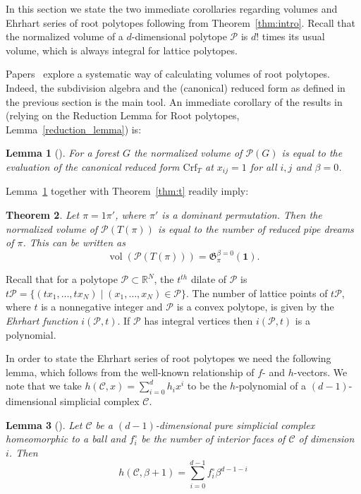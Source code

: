 \documentclass[10pt]{amsart}
\newtheorem{theo}{Theorem}[section]
\newtheorem{lemm}[theo]{Lemma}
\theoremstyle{definition}
\numberwithin{equation}{section}
\DeclareMathOperator{\vol}{vol}
\newcommand*{\Crf}{\mathrm{Crf}}
\newcommand*\C{{\mathcal{C}}}
\renewcommand*\P{{\mathcal{P}}}
\newcommand*\+{\smash{\lower2pt\hbox{\rlap{\vrule height14pt}}\raise2pt\hbox{\rlap{\hskip-3pt \vrule height.4pt depth0pt width14.7pt}}}}
\begin{document}
In this section we state the two immediate corollaries regarding volumes and Ehrhart series of root polytopes following from Theorem~\ref{thm:intro}. Recall that the normalized volume of a $d$-dimensional polytope $\P$ is $d!$ times its usual volume, which is always integral for lattice polytopes.

Papers~\cite{root1, root2} explore a systematic way of calculating volumes of root polytopes. Indeed, the subdivision algebra and the (canonical) reduced form as defined in the previous section is the main tool. An immediate corollary of the results in~\cite{root1} (relying on the Reduction Lemma for Root polytopes, Lemma~\ref{reduction_lemma}) is:

\begin{lemm}[\cite{root1}]\label{l:vol}
For a forest $G$ the normalized volume of $\P(G)$ is equal to the evaluation of the canonical reduced form $\Crf_T$ at $x_{ij}=1$ for all $i,j$ and $\beta=0$.
\end{lemm}

Lemma~\ref{l:vol} together with Theorem~\ref{thm:t} readily imply:

\begin{theo}\label{thm:vol}
Let $\pi=1\pi'$, where $\pi'$ is a dominant permutation. Then the normalized volume of $\P(T(\pi))$ is equal to the number of reduced pipe dreams of $\pi$. This can be written as
\begin{equation}
\vol(\P(T(\pi)))=\mathfrak{G}^{\beta=0}_{\pi} (\mathbf{1}).
\end{equation}
\end{theo}

Recall that for a polytope $\mathcal{P}\subset \mathbb{R}^{N}$, the {$t^{th}$ dilate} of $\mathcal{P}$ is $\displaystyle t \mathcal{P}=\{(tx_1, \dots, tx_{N}) \mid (x_1, \dots, x_{N}) \in \mathcal{P}\}.$ The number of lattice points of $t\mathcal{P}$, where $t$ is a nonnegative integer and $\mathcal{P}$ is a convex polytope, is given by the \emph{Ehrhart function} $i({\mathcal{P}}, t)$. If $\mathcal{P}$ has integral vertices then $i({\mathcal{P}}, t)$ is a polynomial.

In order to state the Ehrhart series of root polytopes we need the following lemma, which follows from the well-known relationship of $f$- and $h$-vectors. We note that we take $h(\C, x)=\sum_{i=0}^d h_{i}x^{i}$ to be the $h$-polynomial of a $(d-1)$-dimensional simplicial complex $\C$.

\begin{lemm}[\cite{Stcom}] \label{pure}
Let $\C$ be a $(d-1)$-dimensional pure simplicial complex homeomorphic to a ball and $f_i^\circ$ be the number of interior faces of $\C$ of dimension $i$. Then
\begin{equation}\label{h}
h(\C, \beta+1)=\sum_{i=0}^{d-1} f_i^\circ \beta^{d-1-i}
\end{equation}
\end{lemm}
\end{document}
